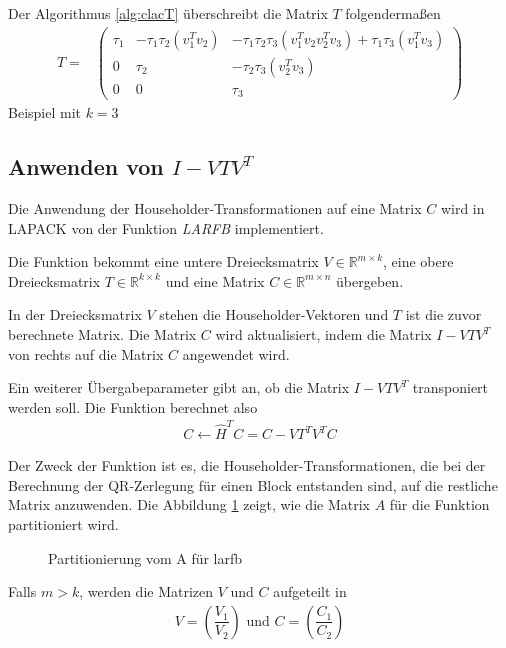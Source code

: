 Der Algorithmus \ref{alg:clacT} überschreibt die Matrix $T$ folgendermaßen
\begin{align*}
T =&
\begin{pmatrix}
\tau_1 & -\tau_1 \tau_2 (v_1^T v_2 ) & - \tau_1 \tau_2  \tau_3 (v_1^T v_2 v_2^T v_3) + \tau_1 \tau_3  (v_1^T v_3)\\ 
0 & \tau_2 &  -\tau_2 \tau_3  (v_2^T v_3)\\
0 & 0 & \tau_3
\end{pmatrix}
\end{align*}
Beispiel mit $k=3$

\subsection{Anwenden von $I - VTV^T$} \label{applyT}
Die Anwendung der Householder-Transformationen auf eine Matrix $C$ wird in LAPACK von der  Funktion \textit{LARFB} implementiert.

Die Funktion bekommt eine untere Dreiecksmatrix $V \in \mathbb{R}^{m \times k}$, eine obere Dreiecksmatrix $T \in \mathbb{R}^{k \times k}$ und eine Matrix $C \in \mathbb{R}^{m \times n }$ übergeben.

In der Dreiecksmatrix $V$ stehen die Householder-Vektoren und $T$ ist die zuvor berechnete Matrix.
Die Matrix $C$ wird aktualisiert, indem die Matrix $I - V T V^T $ von rechts auf die Matrix $ C $ angewendet wird. 

Ein weiterer Übergabeparameter gibt an, ob die Matrix  $I - V T V^T $ transponiert werden soll.
Die Funktion berechnet also
\begin{align}
	C \leftarrow \hat{H}^T C = C - V T^T V^T C	\label{eq:larfb}
\end{align}

Der Zweck der Funktion ist es, die Householder-Transformationen, die bei der Berechnung der QR-Zerlegung für einen Block entstanden sind, auf die restliche Matrix anzuwenden.
Die Abbildung \ref{fig:patrA} zeigt, wie die Matrix $A$ für die Funktion partitioniert wird.
\begin{figure} [H]
	\centering
	
	\caption{Partitionierung vom A für larfb}
	\label{fig:patrA}
\end{figure}
Falls $m > k $, werden die Matrizen $V$ und $C$ aufgeteilt in
\begin{align}
	V=\left(\dfrac{V_1}{V_2}\right)  \text{  und  } C=\left(\dfrac{C_1}{C_2}\right)
	\label{eq:aufteilen}
\end{align}

